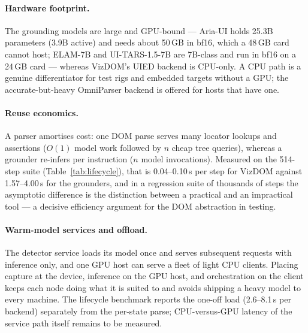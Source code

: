 \documentclass[11pt,a4paper]{article}
\begin{document}
\paragraph{Hardware footprint.} The grounding models are large and GPU-bound ---
Aria-UI holds 25.3B parameters (3.9B active) and needs about 50\,GB in bf16, which a
48\,GB card cannot host; ELAM-7B and UI-TARS-1.5-7B are 7B-class and run in bf16 on
a 24\,GB card --- whereas VizDOM's UIED backend is CPU-only. A CPU path is a genuine
differentiator for test rigs and embedded targets without a GPU; the accurate-but-heavy
OmniParser backend is offered for hosts that have one.

\paragraph{Reuse economics.} A parser amortises cost: one DOM parse serves many
locator lookups and assertions ($O(1)$ model work followed by $n$ cheap tree
queries), whereas a grounder re-infers per instruction ($n$ model invocations).
Measured on the 514-step suite (Table~\ref{tab:lifecycle}), that is 0.04--0.10\,s per
step for VizDOM against 1.57--4.00\,s for the grounders, and in a regression suite of
thousands of steps the asymptotic difference is the distinction between a practical
and an impractical tool --- a decisive efficiency argument for the DOM abstraction in
testing.

\paragraph{Warm-model services and offload.} The detector service loads its model
once and serves subsequent requests with inference only, and one GPU host can serve a
fleet of light CPU clients. Placing capture at the device, inference on the GPU host,
and orchestration on the client keeps each node doing what it is suited to and avoids
shipping a heavy model to every machine. The lifecycle benchmark reports the one-off
load (2.6--8.1\,s per backend) separately from the per-state parse; CPU-versus-GPU
latency of the service path itself remains to be measured.

\end{document}
